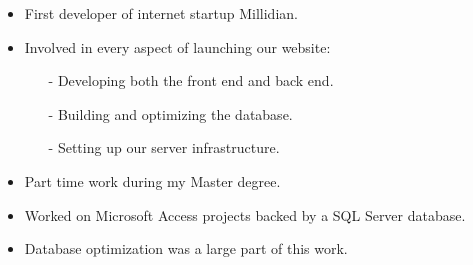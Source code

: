 \documentclass[10pt,a4paper]{../altacv}
\begin{document}
	\medskip
	
	
	
	
	
	\bigskip\bigskip{}
	
	\begin{itemize}
		\item First developer of internet startup Millidian.
		\smallskip
		\item Involved in every aspect of launching our website:
		\begin{itemize}
			\item[-] Developing both the front end and back end.
			\item[-] Building and optimizing the database.
			\item[-] Setting up our server infrastructure.
		\end{itemize}
	\end{itemize}
	
	\medskip
	
	
	
	
	\bigskip\bigskip{}
	
	\begin{itemize}
		\item Part time work during my Master degree.
		\smallskip
		\item Worked on Microsoft Access projects backed by a SQL Server database.
		\smallskip
		\item Database optimization was a large part of this work.
	\end{itemize}
	
	\medskip
	
	
	
	
	
	
	
	
	
	
	\newpage
	
\end{document}
